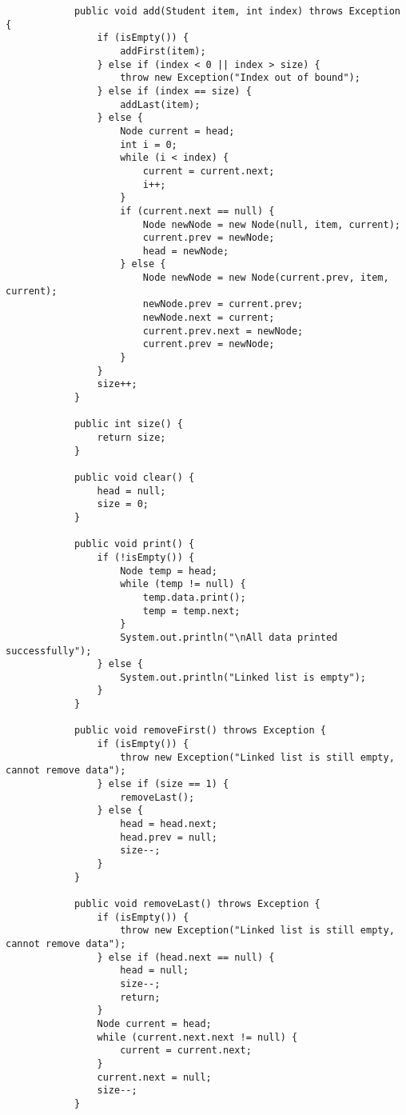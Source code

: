 \documentclass[12pt,titlepage]{article}
\begin{document}
\begin{enumerate}
\begin{verbatim}
            public void add(Student item, int index) throws Exception {
                if (isEmpty()) {
                    addFirst(item);
                } else if (index < 0 || index > size) {
                    throw new Exception("Index out of bound");
                } else if (index == size) {
                    addLast(item);
                } else {
                    Node current = head;
                    int i = 0;
                    while (i < index) {
                        current = current.next;
                        i++;
                    }
                    if (current.next == null) {
                        Node newNode = new Node(null, item, current);
                        current.prev = newNode;
                        head = newNode;
                    } else {
                        Node newNode = new Node(current.prev, item, current);
                        newNode.prev = current.prev;
                        newNode.next = current;
                        current.prev.next = newNode;
                        current.prev = newNode;
                    }
                }
                size++;
            }

            public int size() {
                return size;
            }

            public void clear() {
                head = null;
                size = 0;
            }

            public void print() {
                if (!isEmpty()) {
                    Node temp = head;
                    while (temp != null) {
                        temp.data.print();
                        temp = temp.next;
                    }
                    System.out.println("\nAll data printed successfully");
                } else {
                    System.out.println("Linked list is empty");
                }
            }

            public void removeFirst() throws Exception {
                if (isEmpty()) {
                    throw new Exception("Linked list is still empty, cannot remove data");
                } else if (size == 1) {
                    removeLast();
                } else {
                    head = head.next;
                    head.prev = null;
                    size--;
                }
            }

            public void removeLast() throws Exception {
                if (isEmpty()) {
                    throw new Exception("Linked list is still empty, cannot remove data");
                } else if (head.next == null) {
                    head = null;
                    size--;
                    return;
                } 
                Node current = head;
                while (current.next.next != null) {
                    current = current.next;
                }
                current.next = null;
                size--;
            }


\end{verbatim}
\end{enumerate}
\end{document}
